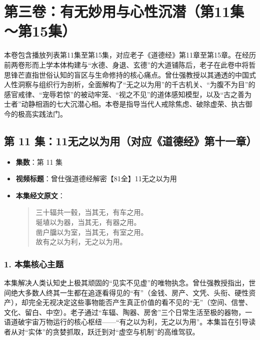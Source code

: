 \section*{第三卷：有无妙用与心性沉潜（第11集～第15集）}

本卷包含播放列表第11集至第15集，对应老子《道德经》第11章至第15章。在经历前两卷形而上学本体构建与“水德、身退、玄德”的大道铺陈后，老子在此卷中将哲思锋芒直指世俗认知的盲区与生命修持的核心痛点。曾仕强教授以其通透的中国式人性洞察与组织行为剖析，全面解构了“无之以为用”的千古机关、“为腹不为目”的感官戒律、“宠辱若惊”的被动牢笼、“视之不见”的道体感知模型，以及“古之善为士者”动静相涵的七大沉潜心相。本卷是指导当代人戒除焦虑、破除虚荣、执古御今的极高实践法门。

\clearpage

\subsection{第 11 集：11无之以为用（对应《道德经》第十一章）}
\label{sec:ep11}

\begin{itemize}
    \item \textbf{集数}：第 11 集
    \item \textbf{视频标题}：曾仕强道德经解密【81全】11无之以为用
    
    \item \textbf{本集经文原文}：
    \begin{quote}\kaishu
    三十辐共一毂，当其无，有车之用。\\
    埏埴以为器，当其无，有器之用。\\
    凿户牖以为室，当其无，有室之用。\\
    故有之以为利，无之以为用。
    \end{quote}
\end{itemize}

\subsubsection{1. 本集核心主题}
本集解决人类认知史上极其顽固的“见实不见虚”的唯物执念。曾仕强教授指出，世间绝大多数人终其一生都在追逐看得见的“有”（金钱、房产、文凭、头衔、硬性资产），却完全无视决定这些事物能否产生真正价值的看不见的“无”（空间、信誉、文化、留白、中空）。老子通过“车辐、陶器、房舍”三个日常生活至极的器物，一语道破宇宙万物运行的核心枢纽——“有之以为利，无之以为用”。本集旨在引导读者从对“实体”的贪婪抓取，跃迁到对“虚空与机制”的高维驾驭。

